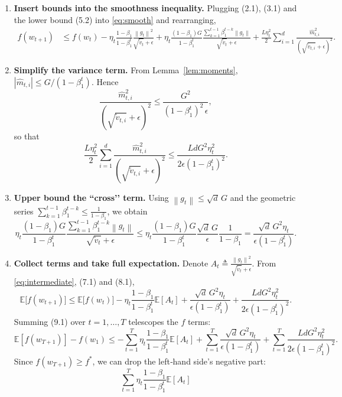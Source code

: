 \documentclass{article}
\newcommand{\E}{\mathbb{E}}
\newcommand{\norm}[1]{\left\lVert #1 \right\rVert}
\begin{document}
\begin{enumerate}
\item[Step 6.] \textbf{Insert bounds into the smoothness inequality.}  
Plugging (2.1), (3.1) and the lower bound (5.2) into \eqref{eq:smooth} and rearranging,
\begin{align}
f(w_{t+1}) &\le f(w_{t})
- \eta_{t}\frac{1-\beta_{1}}{1-\beta_{1}^{t}}\frac{\norm{g_{t}}^{2}}{\sqrt{\tilde v_{t}}+\epsilon}
+ \eta_{t}\frac{(1-\beta_{1})G}{1-\beta_{1}^{t}}\frac{\sum_{k=1}^{t-1}\beta_{1}^{t-k}\norm{g_{t}}}{\sqrt{\tilde v_{t}}+\epsilon}
+ \frac{L\eta_{t}^{2}}{2}\sum_{i=1}^{d}\frac{\hat m_{t,i}^{2}}{(\sqrt{\tilde v_{t,i}}+\epsilon)^{2}}.
\label{eq:intermediate}
\end{align}
\item[Step 7.] \textbf{Simplify the variance term.}  
From Lemma~\ref{lem:moments}, $|\hat m_{t,i}|\le G/(1-\beta_{1}^{t})$. Hence
\[
\frac{\hat m_{t,i}^{2}}{(\sqrt{\tilde v_{t,i}}+\epsilon)^{2}}
\le \frac{G^{2}}{(1-\beta_{1}^{t})^{2}\,\epsilon},
\]
so that
\[
\frac{L\eta_{t}^{2}}{2}\sum_{i=1}^{d}\frac{\hat m_{t,i}^{2}}{(\sqrt{\tilde v_{t,i}}+\epsilon)^{2}}
\le \frac{L d G^{2}\eta_{t}^{2}}{2\epsilon(1-\beta_{1}^{t})^{2}}.
\tag{7.1}
\]
\item[Step 8.] \textbf{Upper bound the “cross’’ term.}  
Using $\norm{g_{t}}\le \sqrt{d}\,G$ and the geometric series $\sum_{k=1}^{t-1}\beta_{1}^{t-k}\le \frac{1}{1-\beta_{1}}$, we obtain
\[
\eta_{t}\frac{(1-\beta_{1})G}{1-\beta_{1}^{t}}\frac{\sum_{k=1}^{t-1}\beta_{1}^{t-k}\norm{g_{t}}}{\sqrt{\tilde v_{t}}+\epsilon}
\le \eta_{t}\frac{(1-\beta_{1})G}{1-\beta_{1}^{t}}\frac{\sqrt{d}\,G}{\epsilon}
\frac{1}{1-\beta_{1}}
= \frac{\sqrt{d}\,G^{2}\eta_{t}}{\epsilon(1-\beta_{1}^{t})}.
\tag{8.1}
\]
\item[Step 9.] \textbf{Collect terms and take full expectation.}  
Denote $A_{t}\triangleq \frac{\norm{g_{t}}^{2}}{\sqrt{\tilde v_{t}}+\epsilon}$. From \eqref{eq:intermediate}, (7.1) and (8.1),
\[
\E\!\bigl[f(w_{t+1})\bigr]
\le \E\!\bigl[f(w_{t})\bigr]
- \eta_{t}\frac{1-\beta_{1}}{1-\beta_{1}^{t}}\E[A_{t}]
+ \frac{\sqrt{d}\,G^{2}\eta_{t}}{\epsilon(1-\beta_{1}^{t})}
+ \frac{L d G^{2}\eta_{t}^{2}}{2\epsilon(1-\beta_{1}^{t})^{2}}.
\tag{9.1}
\]
Summing (9.1) over $t=1,\dots,T$ telescopes the $f$ terms:
\[
\E[f(w_{T+1})]-f(w_{1})
\le -\sum_{t=1}^{T}\eta_{t}\frac{1-\beta_{1}}{1-\beta_{1}^{t}}\E[A_{t}]
+ \sum_{t=1}^{T}\frac{\sqrt{d}\,G^{2}\eta_{t}}{\epsilon(1-\beta_{1}^{t})}
+ \sum_{t=1}^{T}\frac{L d G^{2}\eta_{t}^{2}}{2\epsilon(1-\beta_{1}^{t})^{2}}.
\tag{9.2}
\]
Since $f(w_{T+1})\ge f^{*}$, we can drop the left‑hand side’s negative part:
\[
\sum_{t=1}^{T}\eta_{t}\frac{1-\beta_{1}}{1-\beta_{1}^{t}}\E[A_{t}]
\]
\end{enumerate}
\end{document}
